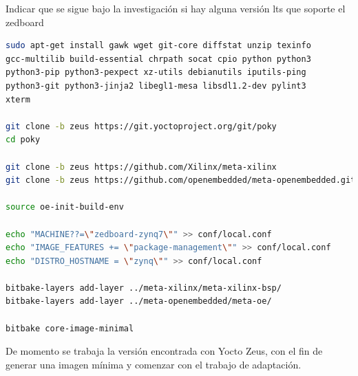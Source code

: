 \documentclass[12pt,letterpaper]{article}
\begin{document}
Indicar que se sigue bajo la investigación si hay alguna versión lts que soporte el zedboard

\begin{lstlisting}[language=bash]
sudo apt-get install gawk wget git-core diffstat unzip texinfo 
gcc-multilib build-essential chrpath socat cpio python python3 
python3-pip python3-pexpect xz-utils debianutils iputils-ping 
python3-git python3-jinja2 libegl1-mesa libsdl1.2-dev pylint3
xterm

git clone -b zeus https://git.yoctoproject.org/git/poky
cd poky

git clone -b zeus https://github.com/Xilinx/meta-xilinx
git clone -b zeus https://github.com/openembedded/meta-openembedded.git

source oe-init-build-env

echo "MACHINE??=\"zedboard-zynq7\"" >> conf/local.conf
echo "IMAGE_FEATURES += \"package-management\"" >> conf/local.conf
echo "DISTRO_HOSTNAME = \"zynq\"" >> conf/local.conf

bitbake-layers add-layer ../meta-xilinx/meta-xilinx-bsp/
bitbake-layers add-layer ../meta-openembedded/meta-oe/

bitbake core-image-minimal
\end{lstlisting}

De momento se trabaja la versión encontrada con Yocto Zeus, con el fin de generar una imagen mínima y comenzar
con el trabajo de adaptación.

%
%
\end{document}
